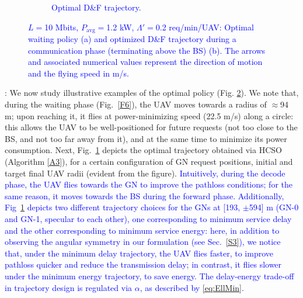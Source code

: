 \documentclass[12pt, draftcls, onecolumn]{IEEEtran}
\theoremstyle{plain}
\theoremstyle{definition}
\theoremstyle{remark}
\newcommand\hlt[1]{\textcolor{blue}{#1}}
\begin{document}
\begin{figure} [t]
\begin{subfigure}{0.515\linewidth}
      \caption{\hlt{Optimal D\&F trajectory.}}
      \label{F7}
    \end{subfigure}
    \vspace{-6mm}
    \caption{\hlt{$L{=}$10 Mbits, $P_{\mathrm{avg}}{=}$1.2 kW,
    $\Lambda'{=}$0.2 req/min/UAV: Optimal waiting policy (a) and optimized D\&F trajectory during a communication phase 
    (terminating above the BS) (b).
    The arrows and associated numerical values represent the direction of motion and the flying speed in m/s.}}
    \label{Fig4}
\end{figure}

: We now study illustrative examples of the optimal policy (Fig. \ref{Fig4}). We note that, during the waiting phase (Fig.~\ref{F6}), the UAV moves towards a radius of $\approx$94 m; upon reaching it, it flies at power-minimizing speed (22.5 m/s) along a circle: this allows the UAV to be well-positioned for future requests (not too close to the BS, and not too far away from it), and at the same time to minimize its power consumption. Next, Fig.~\ref{F7} depicts the optimal trajectory obtained via HCSO (Algorithm \ref{A3}), for a certain configuration of GN request positions, initial and target final UAV radii (evident from the figure). \hlt{Intuitively, during the decode phase, the UAV flies towards the GN to improve the pathloss conditions; for the same reason, it moves towards the BS during the forward phase. Additionally, Fig~\ref{F7} depicts two different trajectory choices for the GNs at [193, $\pm$594] m (GN-0 and GN-1, specular to each other), one corresponding to minimum service delay and the other corresponding to minimum service energy: here, in addition to observing the angular symmetry in our formulation (see Sec.~\ref{S3}), we notice that, under the minimum delay trajectory, the UAV flies faster, to improve pathloss quicker and reduce the transmission delay; in contrast, it flies slower under the minimum energy trajectory, to save energy.
The delay-energy trade-off in trajectory design is regulated via $\alpha$, as described by \eqref{eq:EllMin}.}
\end{document}
